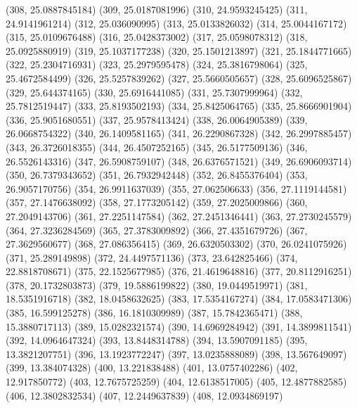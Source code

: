 {					(308, 25.0887845184)
					(309, 25.0187081996)
					(310, 24.9593245425)
					(311, 24.9141961214)
					(312, 25.036090995)
					(313, 25.0133826032)
					(314, 25.0044167172)
					(315, 25.0109676488)
					(316, 25.0428373002)
					(317, 25.0598078312)
					(318, 25.0925880919)
					(319, 25.1037177238)
					(320, 25.1501213897)
					(321, 25.1844771665)
					(322, 25.2304716931)
					(323, 25.2979595478)
					(324, 25.3816798064)
					(325, 25.4672584499)
					(326, 25.5257839262)
					(327, 25.5660505657)
					(328, 25.6096525867)
					(329, 25.644374165)
					(330, 25.6916441085)
					(331, 25.7307999964)
					(332, 25.7812519447)
					(333, 25.8193502193)
					(334, 25.8425064765)
					(335, 25.8666901904)
					(336, 25.9051680551)
					(337, 25.9578413424)
					(338, 26.0064905389)
					(339, 26.0668754322)
					(340, 26.1409581165)
					(341, 26.2290867328)
					(342, 26.2997885457)
					(343, 26.3726018355)
					(344, 26.4507252165)
					(345, 26.5177509136)
					(346, 26.5526143316)
					(347, 26.5908759107)
					(348, 26.6376571521)
					(349, 26.6906093714)
					(350, 26.7379343652)
					(351, 26.7932942448)
					(352, 26.8455376404)
					(353, 26.9057170756)
					(354, 26.9911637039)
					(355, 27.062506633)
					(356, 27.1119144581)
					(357, 27.1476638092)
					(358, 27.1773205142)
					(359, 27.2025009866)
					(360, 27.2049143706)
					(361, 27.2251147584)
					(362, 27.2451346441)
					(363, 27.2730245579)
					(364, 27.3236284569)
					(365, 27.3783009892)
					(366, 27.4351679726)
					(367, 27.3629560677)
					(368, 27.086356415)
					(369, 26.6320503302)
					(370, 26.0241075926)
					(371, 25.289149898)
					(372, 24.4497571136)
					(373, 23.642825466)
					(374, 22.8818708671)
					(375, 22.1525677985)
					(376, 21.4619648816)
					(377, 20.8112916251)
					(378, 20.1732803873)
					(379, 19.5886199822)
					(380, 19.0449519971)
					(381, 18.5351916718)
					(382, 18.0458632625)
					(383, 17.5354167274)
					(384, 17.0583471306)
					(385, 16.599125278)
					(386, 16.1810309989)
					(387, 15.7842365471)
					(388, 15.3880717113)
					(389, 15.0282321574)
					(390, 14.6969284942)
					(391, 14.3899811541)
					(392, 14.0964647324)
					(393, 13.8448314788)
					(394, 13.5907091185)
					(395, 13.3821207751)
					(396, 13.1923772247)
					(397, 13.0235888089)
					(398, 13.567649097)
					(399, 13.384074328)
					(400, 13.221838488)
					(401, 13.0757402286)
					(402, 12.917850772)
					(403, 12.7675725259)
					(404, 12.6138517005)
					(405, 12.4877882585)
					(406, 12.3802832534)
					(407, 12.2449637839)
					(408, 12.0934869197)
}

